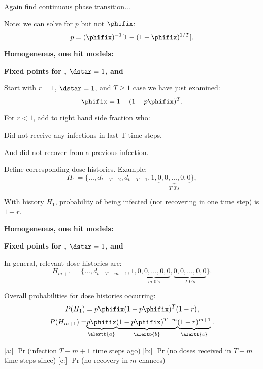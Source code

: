       Again find continuous phase transition...
    
      Note: we can solve for $p$ but not $\phifix$:
      $$
      p = (\phifix)^{-1} [ 1 - (1-\phifix)^{1/T} ].
      $$
    
  
  

  \textbf{Homogeneous, one hit models:}

  \textbf{Fixed points for , $\dstar=1$, and }
    
     
      Start with $r=1$, $\dstar=1$, and $T \ge 1$ case we have
      just examined:
      $$
      \phifix = 1 - (1 - p\phifix)^T.
      $$
     
      For $r<1$, add to right hand side fraction who:
      
      
        Did not receive any infections in last T time steps,
      
        And \alert{did not recover} from a previous infection.
      
    
      Define corresponding dose histories.  Example:
      {
      $$
      H_1 = \{ \ldots, d_{t-T-2}, d_{t-T-1}, 1, 
      \underbrace{0, 0, \ldots, 0, 0}_{\mbox{$T$ 0's}} \},
      $$
      }
    
      With history $H_1$, probability of being infected
      (not recovering in one time step) is $1-r$.
    
  
 

  \textbf{Homogeneous, one hit models:}

  \textbf{Fixed points for , $\dstar=1$, and }
    
    
      In general, relevant dose histories are:
      $$
      H_{m+1} = \{ \ldots, d_{t-T-m-1}, 1, \underbrace{0, 0, \ldots, 0, 0}_{\mbox{$m$ 0's}}, \underbrace{0, 0, \ldots, 0, 0}_{\mbox{$T$ 0's}} \}.
      $$
    
      Overall probabilities for dose histories occurring:
      {
      $$
      P(H_1) = p\phifix (1 -p\phifix)^T (1-r), 
      $$
      }
      $$
      {
        P(H_{m+1}) = 
        }
      {
       \underbrace{p\phifix}_{\alertb{a}}
      }
      {
        \underbrace{(1 -p\phifix)^{T+m}}_{\alertb{b}}
      }
      {
        \underbrace{(1-r)^{m+1}}_{\alertb{c}}.
      }
      $$
      
      [a:] $\Pr$(infection $T+m+1$ time steps ago)
      [b:] $\Pr$(no doses received in $T+m$ time steps since)
      [c:] $\Pr$(no recovery in $m$ chances)
      
    
  




